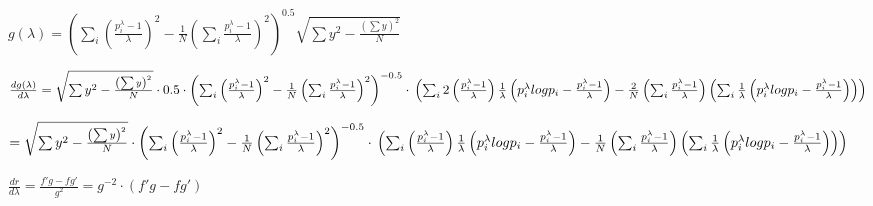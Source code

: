 \begin{math}
g(\lambda)=
\left(\sum_i\left(\frac{p_i^{\lambda}-1}{\lambda}\right)^2-\frac{1}{N}\left(\sum_i \frac{p_i^{\lambda}-1}{\lambda}\right)^2  \right)^{0.5} 
\sqrt{\sum{y^2}-\frac{\left(\sum{y}\right)^2}{N}}
\end{math}

\begin{math}
\frac{dg(\lambda)}{d\lambda}=
\sqrt{\sum{y^2}-\frac{\left(\sum{y}\right)^2}{N}}\cdot
0.5\cdot\left(\sum_i\left(\frac{p_i^{\lambda}-1}{\lambda}\right)^2-\frac{1}{N}\left(\sum_i \frac{p_i^{\lambda}-1}{\lambda}\right)^2  \right)^{-0.5} 
\cdot\\
\left(
\sum_i2\left(\frac{p_i^{\lambda}-1}{\lambda} \right)\frac{1}{\lambda}\left(p_i^{\lambda}log{p_i}-\frac{p_i^{\lambda}-1}{\lambda}\right)
-\frac{2}{N}\left(\sum_i \frac{p_i^{\lambda}-1}{\lambda}\right) \left(\sum_i \frac{1}{\lambda}\left(p_i^{\lambda}log{p_i}-\frac{p_i^{\lambda}-1}{\lambda}\right) \right)
\right)
\end{math}

\begin{math}
=
\sqrt{\sum{y^2}-\frac{\left(\sum{y}\right)^2}{N}}\cdot
\left(\sum_i\left(\frac{p_i^{\lambda}-1}{\lambda}\right)^2-\frac{1}{N}\left(\sum_i \frac{p_i^{\lambda}-1}{\lambda}\right)^2  \right)^{-0.5} 
\cdot\\
\left(
\sum_i\left(\frac{p_i^{\lambda}-1}{\lambda} \right)\frac{1}{\lambda}\left(p_i^{\lambda}log{p_i}-\frac{p_i^{\lambda}-1}{\lambda}\right)
-\frac{1}{N}\left(\sum_i \frac{p_i^{\lambda}-1}{\lambda}\right) \left(\sum_i \frac{1}{\lambda}\left(p_i^{\lambda}log{p_i}-\frac{p_i^{\lambda}-1}{\lambda}\right) \right)
\right)
\end{math}

\begin{math}
\frac{dr}{d\lambda}=\frac{f'g-fg'}{g^2}=g^{-2}\cdot\left(f'g-fg'\right)
\end{math}

